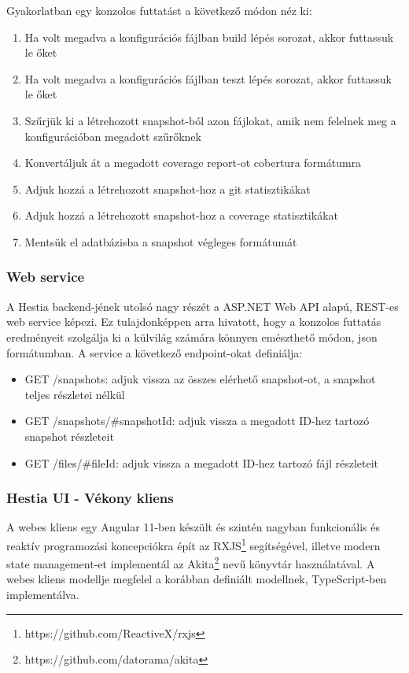 Gyakorlatban egy konzolos futtatást a következő módon néz ki:
\begin{enumerate}
    \item Ha volt megadva a konfigurációs fájlban build lépés sorozat, akkor futtassuk le őket
    \item Ha volt megadva a konfigurációs fájlban teszt lépés sorozat, akkor futtassuk le őket
    \item Szűrjük ki a létrehozott snapshot-ból azon fájlokat, amik nem felelnek meg a konfigurációban megadott szűrőknek
    \item Konvertáljuk át a megadott coverage report-ot cobertura formátumra
    \item Adjuk hozzá a létrehozott snapshot-hoz a git statisztikákat
    \item Adjuk hozzá a létrehozott snapshot-hoz a coverage statisztikákat
    \item Mentsük el adatbázisba a snapshot végleges formátumát
\end{enumerate}

\subsubsection{Web service}

A Hestia backend-jének utolsó nagy részét a ASP.NET Web API alapú, REST-es web service képezi. Ez tulajdonképpen arra hivatott, hogy a konzolos futtatás eredményeit szolgálja ki a külvilág számára könnyen emészthető módon, json formátumban. A service a következő endpoint-okat definiálja:
\begin{itemize}
    \item GET /snapshots: adjuk vissza az összes elérhető snapshot-ot, a snapshot teljes részletei nélkül
    \item GET /snapshots/\#snapshotId: adjuk vissza a megadott ID-hez tartozó snapshot részleteit
    \item GET /files/\#fileId: adjuk vissza a megadott ID-hez tartozó fájl részleteit
\end{itemize}

\subsubsection{Hestia UI - Vékony kliens}

A webes kliens egy Angular 11-ben készült és szintén nagyban funkcionális és reaktív programozási koncepciókra épít az RXJS\footnote{https://github.com/ReactiveX/rxjs} segítségével, illetve modern state management-et implementál az Akita\footnote{https://github.com/datorama/akita} nevű könyvtár használatával. A webes kliens modellje megfelel a korábban definiált modellnek, TypeScript-ben implementálva.

